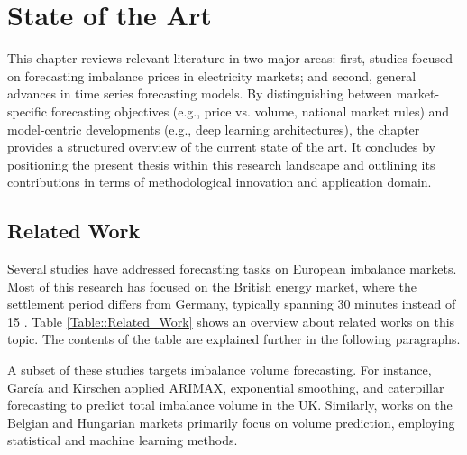 \documentclass[class=scrbook, crop=false]{standalone}
\begin{document}
\chapter{State of the Art}
\label{Chapter::State_of_the_Art} %
This chapter reviews relevant literature in two major areas: first, studies focused on forecasting imbalance prices in electricity markets; and second, general advances in time series forecasting models. 
By distinguishing between market-specific forecasting objectives (e.g., price vs. volume, national market rules) and model-centric developments (e.g., deep learning architectures), the chapter provides a structured overview of the current state of the art.
 It concludes by positioning the present thesis within this research landscape and outlining its contributions in terms of methodological innovation and application domain.

\section{Related Work}
\label{Section::Related_Work}
Several studies have addressed forecasting tasks on European imbalance markets. Most of this research has focused on the British energy market, where the settlement period differs from Germany, typically spanning 30 minutes instead of 15 \cite{narajewskiProbabilisticForecastingGerman2022} \cite{limaBayesianPredictiveDistributions2023}. Table \ref{Table::Related_Work} shows an overview about related works on this topic. The contents of the table are explained further in the following paragraphs.



A subset of these studies targets imbalance volume forecasting. For instance, García and Kirschen \cite{garciaForecastingSystemImbalance2006} applied \gls{ARIMAX}, exponential smoothing, and caterpillar forecasting to predict total imbalance volume in the UK. Similarly, works on the Belgian \cite{bottieauVeryShortTermProbabilisticForecasting2020} \cite{dumasProbabilisticForecastingImbalance2019} and Hungarian  \cite{balazsShorttermSystemImbalance2024} markets primarily focus on volume prediction, employing statistical and machine learning methods.
\end{document}
